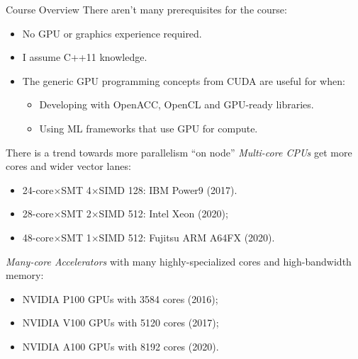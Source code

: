 \documentclass[aspectratio=43]{beamer}
\begin{document}
\begin{frame}[fragile]{Course Overview}
    There aren't many prerequisites for the course:
    \begin{itemize}
        \item No GPU or graphics experience required.
        \item I assume C++11 knowledge.
        \item The generic GPU programming concepts from CUDA are useful for when:
        \begin{itemize}
            \item Developing with OpenACC, OpenCL and GPU-ready libraries.
            \item Using ML frameworks that use GPU for compute.
        \end{itemize}
    \end{itemize}
\end{frame}


\begin{frame}[fragile]{}
    \begin{info}{There is a trend towards more parallelism ``on node''}
        \emph{Multi-core CPUs} get more cores and wider vector lanes:
        \begin{itemize}
            \item 24-core$\times$SMT 4$\times$SIMD 128: IBM Power9 (2017).
            \item 28-core$\times$SMT 2$\times$SIMD 512: Intel Xeon (2020);
            \item 48-core$\times$SMT 1$\times$SIMD 512: Fujitsu ARM A64FX (2020).
        \end{itemize}
        \emph{Many-core Accelerators} with many highly-specialized cores and high-bandwidth memory:
        \begin{itemize}
            \item NVIDIA P100 GPUs with 3584 cores (2016);
            \item NVIDIA V100 GPUs with 5120 cores (2017);
            \item NVIDIA A100 GPUs with 8192 cores (2020).
        \end{itemize}
    \end{info}

\end{frame}
\end{document}
